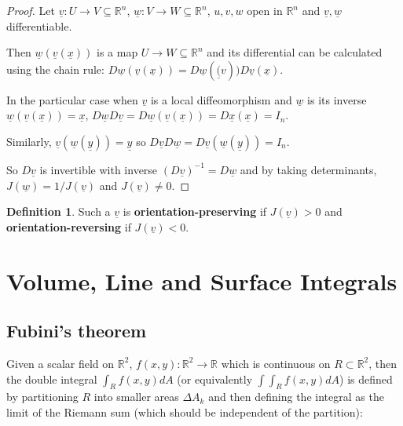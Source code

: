 \documentclass[12pt,a4paper]{article}
\theoremstyle{definition}
\newtheorem{definition}{Definition}[subsection]
\begin{document}
\begin{proof}
	Let $\underline{v}: U \rightarrow V \subseteq \mathbb{R}^n$, $\underline{w}: V \rightarrow W \subseteq \mathbb{R}^n$, $u, v, w$ open in $\mathbb{R}^n$ and $\underline{v}, \underline{w}$ differentiable.

	Then $\underline{w}(\underline{v}(\underline{x}))$ is a map $U \rightarrow W \subseteq \mathbb{R}^n$ and its differential can be calculated using the chain rule: $D \underline{w}(\underline{v}(\underline{x})) = D \underline{w}(\underline(v)) D \underline{v}(\underline{x})$.

	In the particular case when $\underline{v}$ is a local diffeomorphism and $\underline{w}$ is its inverse $\underline{w}(\underline{v}(\underline{x})) = \underline{x}$, $D \underline{w} D \underline{v} = D \underline{w}(\underline{v}(\underline{x})) = D \underline{x}(\underline{x}) = I_n$.

	Similarly, $\underline{v}(\underline{w}(\underline{y})) = \underline{y}$ so $D \underline{v} D \underline{w} = D \underline{v}(\underline{w}(\underline{y})) = I_n$.

	So $D \underline{v}$ is invertible with inverse ${(D \underline{v})}^{-1} = D \underline{w}$ and by taking determinants, $J(\underline{w}) = 1 / J(\underline{v})$ and $J(\underline{v}) \ne 0$.
\end{proof}

\begin{definition}
	Such a $\underline{v}$ is \textbf{orientation-preserving} if $J(\underline{v}) > 0$ and \textbf{orientation-reversing} if $J(\underline{v}) < 0$.
\end{definition}

\section{Volume, Line and Surface Integrals}

\subsection{Fubini's theorem}

Given a scalar field on $\mathbb{R}^2$, $f(x, y): \mathbb{R}^2 \rightarrow \mathbb{R}$ which is continuous on $R \subset \mathbb{R}^2$, then the double integral $\int_R f(x, y) dA$ (or equivalently $\int \int_R f(x, y) dA$) is defined by partitioning $R$ into smaller areas $\Delta A_k$ and then defining the integral as the limit of the Riemann sum (which should be independent of the partition):
\end{document}
